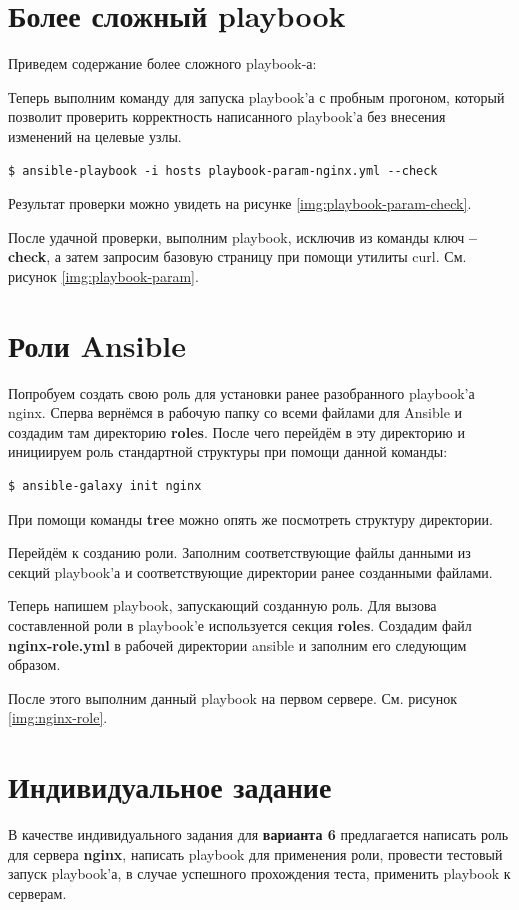 \documentclass[a4paper,14pt]{extarticle}
\begin{document}
\newpage
\section{Более сложный playbook}
Приведем содержание более сложного playbook-а:


Теперь выполним команду для запуска playbook’а с пробным прогоном, который позволит проверить корректность написанного playbook’а без внесения изменений на целевые узлы.

\begin{lstlisting}
$ ansible-playbook -i hosts playbook-param-nginx.yml --check
\end{lstlisting}
Результат проверки можно увидеть на рисунке \ref{img:playbook-param-check}.

После удачной проверки, выполним playbook, исключив из команды ключ \textbf{--check}, а затем запросим базовую страницу при помощи утилиты curl. См. рисунок \ref{img:playbook-param}.

\section{Роли Ansible}

Попробуем создать свою роль для установки ранее разобранного playbook’а nginx. Сперва вернёмся в рабочую папку со всеми файлами для Ansible и создадим там директорию \textbf{roles}. После чего перейдём в эту директорию и инициируем роль стандартной структуры при помощи данной команды:
\begin{lstlisting}
$ ansible-galaxy init nginx
\end{lstlisting}

При помощи команды \textbf{tree} можно опять же посмотреть структуру директории.

Перейдём к созданию роли. Заполним соответствующие файлы данными из секций playbook’а и соответствующие директории ранее созданными файлами.

Теперь напишем playbook, запускающий созданную роль. Для вызова составленной роли в playbook’е используется секция \textbf{roles}. Создадим файл \textbf{nginx-role.yml} в рабочей директории ansible и заполним его следующим образом.



После этого выполним данный playbook на первом сервере. См. рисунок \ref{img:nginx-role}.

\section{Индивидуальное задание}
В качестве индивидуального задания для \textbf{варианта 6} предлагается написать роль для сервера \textbf{nginx}, написать playbook для применения роли, провести тестовый запуск playbook’а, в случае успешного прохождения теста, применить playbook к серверам.
\end{document}

